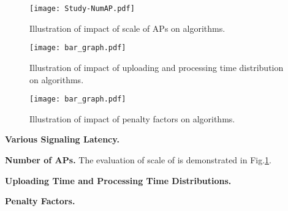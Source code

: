 \begin{figure}[hbt]                                                 %
    \centering                                                      %
    \texttt{[image: Study-NumAP.pdf]}           %
    \caption{Illustration of impact of scale of APs on algorithms.}
    \label{fig:ss_scale}                                            %
\end{figure}                                                        %

\begin{figure}[hbt]                                                 %
    \centering                                                      %
    \texttt{[image: bar\_graph.pdf]}           %
    \caption{Illustration of impact of uploading and processing time distribution on algorithms.}
    \label{fig:ss_dist}                                             %
\end{figure}                                                        %

\begin{figure}[hbt]                                                 %
    \centering                                                      %
    \texttt{[image: bar\_graph.pdf]}           %
    \caption{Illustration of impact of penalty factors on algorithms.}
    \label{fig:ss_penalty}                                          %
\end{figure}                                                        %

\textbf{Various Signaling Latency.}

\textbf{Number of APs.} %
The evaluation of scale of is demonstrated in Fig.\ref{fig:ss_scale}.

\textbf{Uploading Time and Processing Time Distributions.}

\textbf{Penalty Factors.}

